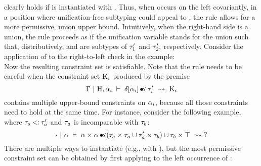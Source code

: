 clearly holds if \va is instantiated with
\tyunion{\tyint}{\tyflt}.
Thus, when \va occurs on the left covariantly, in a position where 
unification-free subtyping could appeal to ,
the rule  allows for a more permissive, union upper bound.
Intuitively, when the right-hand side is a union, the rule proceeds as 
if the unification variable \va stands for the union 
such that, distributively, \plug{} and \plug{}
are subtypes of $\tau'_1$ and $\tau'_2,$ respectively.
Consider the application of  to the right-to-left check
in the example:\\
Now the resulting constraint set
\ctrset{\ctrsub{\va}{\tyunion\tyint\tyflt}, 
\ctrsub{\tyint}{\va}, \ctrsub{\tyflt}{\va}}
is satisfiable.
Note that the rule  needs to be careful when 
the constraint set $\mathrm{K}_i$ produced by the premise
\[\Gamma~\vert~\mathrm{H},\alpha_i\;\vdash\;\delta[\alpha_i] \operatorname{\bullet\!\!\lessdot} \tau'_i\ \rightsquigarrow\ \mathrm{K}_i\]
contains multiple upper-bound constraints on $\alpha_i$, because all those
constraints need to hold at the same time.
For instance, consider the following example,
where $\tau_a \operatorname{<:} \tau'_a$ and $\tau_a$ is incomparable with $\tau_b$:
\[
    \cdot~\vert~\alpha\;\vdash\;\alpha \times \alpha \operatorname{\bullet\!\!\lessdot} (\tau_a \times \tau_a \cup \tau'_a \times \tau_b) \cup \tau_b \times \top\ \rightsquigarrow\  ? 
\]
There are multiple ways to instantiate \va (e.g., with \tybot),
but the most permissive constraint set can be obtained by first
applying  to the left occurrence of \va:\\
